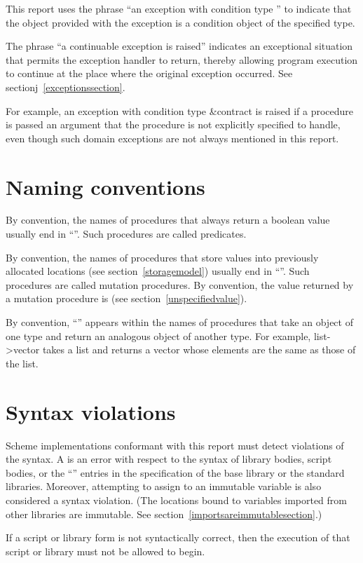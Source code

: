 This report uses the phrase ``an exception with condition type ''
to indicate that the object provided with the
exception is a condition object of the specified type.

The phrase ``a continuable exception is raised'' indicates
an exceptional situation that permits the exception handler to return,
thereby allowing program execution to continue at the place where the
original exception occurred.  See sectionj~\ref{exceptionssection}.

\vest For example, an exception with condition type {\cf\&contract}
is raised if a procedure is passed an argument that the procedure
is not explicitly specified to handle, even though such domain
exceptions are not always mentioned in this report.

\section{Naming conventions}

By convention, the names of procedures that always return a boolean
value usually end
in ``''.  Such procedures are called predicates.

By convention, the names of procedures that store values into previously
allocated locations (see section~\ref{storagemodel}) usually end in
``\ide{!}''.
Such procedures are called mutation procedures.
By convention, the value returned by a mutation procedure is
\unspecifiedreturn{} (see section~\ref{unspecifiedvalue}).

By convention, ``\ide{->}'' appears within the names of procedures that
take an object of one type and return an analogous object of another type.
For example, {\cf list->vector} takes a list and returns a vector whose
elements are the same as those of the list.

\section{Syntax violations}

Scheme implementations conformant with this report must detect
violations of the syntax.  A  is an error
with respect to the syntax of library bodies, script bodies,
or the ``\exprtype'' entries in the
specification of the base library or the standard libraries.
Moreover, attempting to assign to an immutable variable is also
considered a syntax violation.  (The locations bound to variables
imported from other libraries are immutable.  See
section~\ref{importsareimmutablesection}.)

If a script or library form is not syntactically correct, then the
execution of that script or library must not be allowed to begin.

